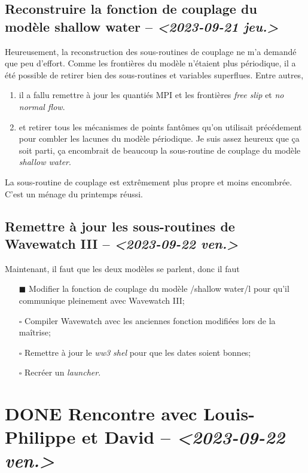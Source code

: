\documentclass[10pt]{article}
\numberwithin{equation}{section}
\renewcommand{\boxtimes}{\blacksquare}
\begin{document}
\subsection{Reconstruire la fonction de couplage du modèle shallow water -- \textit{<2023-09-21 jeu.>}}
\label{sec:orgec94d41}
Heureusement, la reconstruction des sous-routines de couplage ne m'a demandé que peu d'effort. 
Comme les frontières du modèle n'étaient plus périodique, il a été possible de retirer bien des sous-routines et variables superflues.
Entre autres,
\begin{enumerate}
\item il a fallu remettre à jour les quantiés MPI et les frontières \emph{free slip} et \emph{no normal flow}.
\item et retirer tous les mécanismes de points fantômes qu'on utilisait précédement pour combler les lacunes du modèle périodique.
Je suis assez heureux que ça soit parti, ça encombrait de beaucoup la sous-routine de couplage du modèle \emph{shallow water}.
\end{enumerate}
La sous-routine de couplage est extrêmement plus propre et moins encombrée.
C'est un ménage du printemps réussi.


\subsection{Remettre à jour les sous-routines de Wavewatch III -- \textit{<2023-09-22 ven.>}}
\label{sec:org5aafda7}
Maintenant, il faut que les deux modèles se parlent, donc il faut
\begin{itemize}
\item[{$\boxtimes$}] Modifier la fonction de couplage du modèle /shallow water/l pour qu'il communique pleinement avec Wavewatch III;
\item[{$\square$}] Compiler Wavewatch avec les anciennes fonction modifiées lors de la maîtrise;
\item[{$\square$}] Remettre à jour le \emph{ww3 shel} pour que les dates soient bonnes;
\item[{$\square$}] Recréer un \emph{launcher}.
\end{itemize}


\section{{\bfseries\sffamily DONE} Rencontre avec Louis-Philippe et David -- \textit{<2023-09-22 ven.>}}
\label{sec:orgdc956d8}
\end{document}
